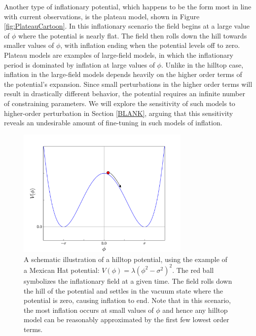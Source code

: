 \documentclass[a4paper,11pt]{article}
\begin{document}
Another type of inflationary potential, which happens to be the form most in line with current observations, is the plateau model, shown in Figure \ref{fig:PlateauCartoon}. In this inflationary scenario the field begins at a large value of $\phi$ where the potential is nearly flat. The field then rolls down the hill towards smaller values of $\phi$, with inflation ending when the potential levels off to zero. Plateau models are examples of large-field models, in which the inflationary period is dominated by inflation at large values of $\phi$. Unlike in the hilltop case, inflation in the large-field models depends heavily on the higher order terms of the potential's expansion. Since small perturbations in the higher order terms will result in drastically different behavior, the potential requires an infinite number of constraining parameters. We will explore the sensitivity of such models to higher-order perturbation in Section \ref{BLANK}, arguing that this sensitivity reveals an undesirable amount of fine-tuning in such models of inflation.

\begin{figure}[h]
	\centering
	\includegraphics[width=0.75\textwidth]{figures/hilltop_cartoon.pdf}
	\caption[Schematic illustration of a Hilltop Model]{A schematic illustration of a hilltop potential, using the example of a Mexican Hat potential: $V(\phi)=\lambda(\phi^2-\sigma^2)^2$. The red ball symbolizes the inflationary field at a given time. The field rolls down the hill of the potential and settles in the vacuum state where the potential is zero, causing inflation to end. Note that in this scenario, the most inflation occurs at small values of $\phi$ and hence any hilltop model can be reasonably approximated by the first few lowest order terms.}
	\label{fig:MexHatCartoon}
\end{figure}
\end{document}
